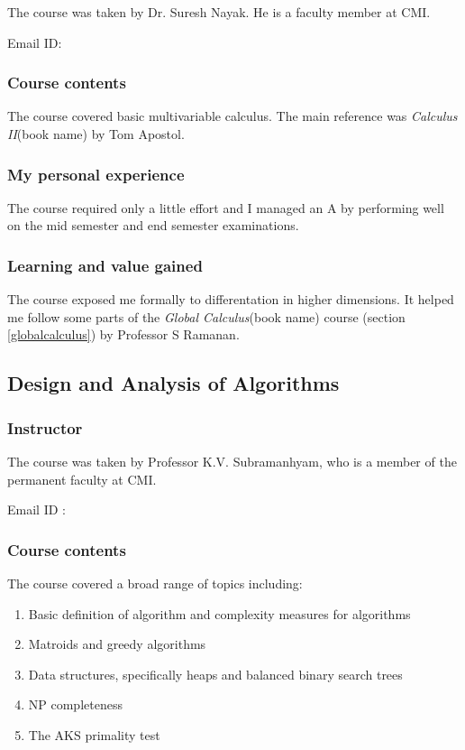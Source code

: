 \documentclass[a4paper]{amsart}
\newcommand{\bookname}[1]{{\em #1}{\small{(book name)}}}
\begin{document}
The course was taken by Dr. Suresh Nayak. He is a faculty member at CMI.

Email ID: 

\subsubsection{Course contents}

The course covered basic multivariable calculus. The main reference was \bookname{Calculus II} by Tom Apostol.

\subsubsection{My personal experience} 

The course required only a little effort and I managed an A by performing well
on the mid semester and end semester examinations.

\subsubsection{Learning and value gained}

The course exposed me formally to differentation in higher dimensions.
It helped me follow some parts of the \bookname{Global Calculus} course (section
\ref{globalcalculus}) by Professor S Ramanan.

\subsection{Design and Analysis of Algorithms}\label{algorithms}

\subsubsection{Instructor}

The course was taken by Professor K.V. Subramanhyam, who is a member of the permanent faculty at CMI.

Email ID : 

\subsubsection{Course contents}

The course covered a broad range of topics including: %

\begin{enumerate}

\item Basic definition of algorithm and complexity measures for algorithms

\item Matroids and greedy algorithms

\item Data structures, specifically heaps and balanced binary search trees 

\item NP completeness

\item The AKS primality test

\end{enumerate}
\end{document}
